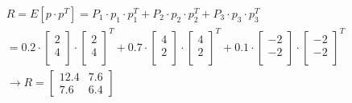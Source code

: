 \[
\begin{gathered}
	R = E[p \cdot p^T] = P_1 \cdot p_1 \cdot p_1^T + P_2 \cdot p_2 \cdot p_2^T + P_3 \cdot p_3 \cdot p_3^T \\ = 0.2 \cdot \left[
	\begin{array}{c}  
		2 \\  
		4 \\
	\end{array}
	\right] \cdot \left[
	\begin{array}{c}  
		2 \\  
		4 \\
	\end{array}
	\right]^T +  0.7 \cdot \left[
	\begin{array}{c}  
		4 \\  
		2 \\
	\end{array}
	\right] \cdot \left[
	\begin{array}{c}  
		4 \\  
		2 \\
	\end{array}
	\right]^T +  0.1 \cdot \left[
	\begin{array}{c}  
		-2 \\  
		-2 \\
	\end{array}
	\right] \cdot \left[
	\begin{array}{c}  
		-2 \\  
		-2 \\
	\end{array}
	\right]^T \\
	\rightarrow R = \left[
	\begin{array}{cc}
		12.4 & 7.6 \\
		7.6 & 6.4
	\end{array}
	\right]	
\end{gathered}
\]




	

